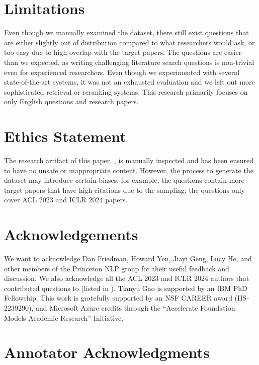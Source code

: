 \section*{Limitations}
Even though we manually examined the dataset,
there still exist questions that are either slightly out of distribution compared to what researchers would ask, 
or too easy due to high overlap with the target papers.
The \authorq{} questions are easier than we expected,
as writing challenging literature search questions is non-trivial even for experienced researchers. 
Even though we experimented with several state-of-the-art systems, it was not an exhausted evaluation and we left out more sophisticated retrieval or reranking systems. 
This research primarily focuses on only English questions and research papers.

\section*{Ethics Statement}

The research artifact of this paper, \ours{}, is manually inspected and has been ensured to have no unsafe or inappropriate  content. 
However, the process to generate the dataset may introduce certain biases: for example, the \inlineq{} questions contain more target papers that have high citations due to the sampling; the \authorq{} questions only cover ACL 2023 and ICLR 2024 papers.

\section*{Acknowledgements}
We want to acknowledge Dan Friedman, Howard Yen, Jiayi Geng, Lucy He, and other members of the Princeton NLP group for their useful feedback and discussion.
We also acknowledge all the ACL 2023 and ICLR 2024 authors that contributed questions to \ours{} (listed in ). 
Tianyu Gao is supported by an IBM PhD Fellowship.
This work is gratefully supported by an NSF CAREER award (IIS-2239290), and Microsoft Azure credits through the ``Accelerate Foundation Models Academic Research'' Initiative.



\clearpage
\appendix

\onecolumn

\section{Annotator Acknowledgments}
\label{app:author_ack}

